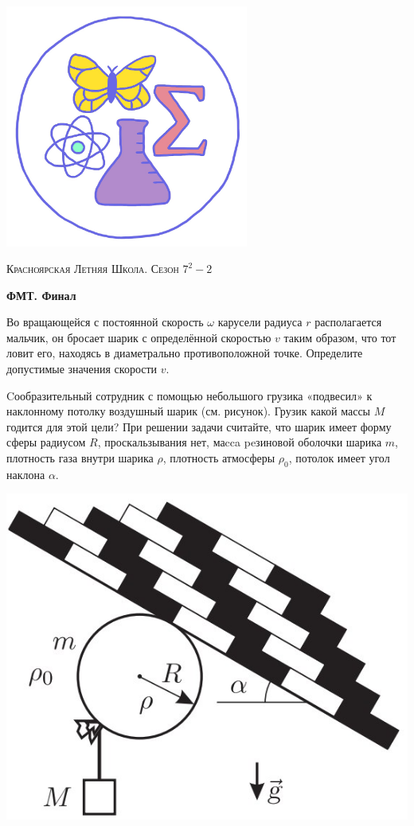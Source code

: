 \colorbox{white!10!}{
    \begin{minipage}{0.2\textwidth}
       \begin{flushleft}
        \includegraphics[width = 0.6\textwidth]{Эмблема.png}
       \end{flushleft}
    \end{minipage}
    \begin{minipage}[t]{0.7 \textwidth}
        \begin{center}
            {\huge \textsc{Красноярская Летняя Школа. Сезон $7^2 - 2$}}
            \vspace{0.25cm}
            
            { \huge \textbf{ФМТ. Финал}}
        \end{center}
        \vspace{0.05cm}
    \end{minipage}
}

\begin{enumerate}
    
    
    \item Во вращающейся с постоянной скорость  $\omega$ карусели радиуса $r$ располагается мальчик, он бросает шарик с определённой скоростью $v$ таким образом, что тот ловит его, находясь в диаметрально противоположной точке. Определите допустимые значения скорости $v$. \\

    
   \parbox[b]{.7\textwidth}{%
    \item Cообразительный сотрудник с помощью небольшого грузика «подвесил» к наклонному потолку воздушный шарик (см. рисунок). Грузик какой массы $M$ годится для этой цели? При решении задачи считайте, что шарик имеет форму сферы радиусом $R$, проскальзывания нет, маcca peзиновой оболочки шарика $m$, плотность газа внутри шарика $\rho$, плотность атмосферы $\rho_0$, потолок имеет угол наклона $\alpha$.
    }\hfill\includegraphics[width=.3\textwidth]{pictures/Final_2.png}

\end{enumerate}